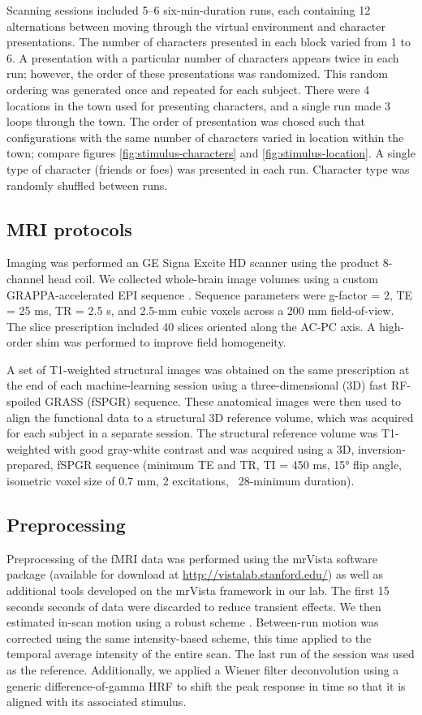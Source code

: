 \documentclass[preprint,5p,authoryear]{elsarticle}
\begin{document}
Scanning sessions included 5--6 six-min-duration runs,
each containing 12 alternations between moving through the virtual environment and character presentations. 
The number of characters presented in each block varied from 1 to 6.
A presentation with a particular number of characters appears twice in each run; however, the order of these presentations was randomized.
This random ordering was generated once and repeated for each subject.
There were 4 locations in the town used for presenting characters, and a single run made 3 loops through the town.
The order of presentation was chosed such that configurations with the same number of characters varied in location within the town; compare figures \ref{fig:stimulus-characters} and \ref{fig:stimulus-location}.
A single type of character (friends or foes) was presented in each run. Character type was randomly shuffled between runs.

\subsection{MRI protocols}
Imaging was performed an GE Signa Excite HD scanner using the product 8-channel head coil.
We collected whole-brain image volumes using a custom GRAPPA-accelerated EPI sequence \citep{newbold}. 
Sequence parameters were g-factor = 2,  TE = 25 ms, TR = 2.5 s, and  2.5-mm cubic voxels across a 200 mm field-of-view. 
The slice prescription included 40 slices oriented along the AC-PC axis. 
A high-order shim was  performed to improve field homogeneity.

A set of T1-weighted structural images was obtained on the same prescription at the end of each machine-learning session using a three-dimensional (3D) fast RF-spoiled GRASS (fSPGR) sequence. 
These anatomical images were then used to align the functional data to a structural 3D reference volume, which was acquired for each subject in a separate session. 
The structural reference volume was T1-weighted with good gray-white contrast and was acquired using a 3D, inversion-prepared, fSPGR sequence (minimum TE and TR, TI = 450 ms, 15° flip angle, isometric voxel size of 0.7 mm, 2 excitations, ~28-minimum duration).

\subsection{Preprocessing}
Preprocessing of the fMRI data was performed using the mrVista software package (available for download at \url{http://vistalab.stanford.edu/}) as well as additional tools developed on the mrVista framework in our lab. 
The first 15 seconds seconds of data  were discarded to reduce transient effects.
We then estimated in-scan motion using a robust scheme \citep{Nestares-and-Heeger-2000}. 
Between-run motion was corrected using the same intensity-based scheme, this time applied to the temporal average intensity of the entire scan. 
The last run of the session was used as the reference. 
Additionally, we applied a Wiener filter deconvolution \citep{Wiener} using a generic difference-of-gamma HRF \citep{Glover} to shift the peak response in time so that it is aligned with its associated stimulus.
\end{document}
